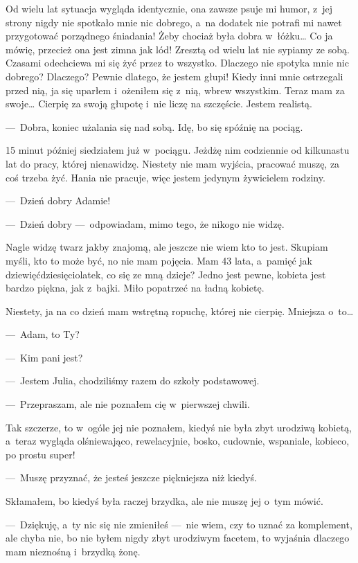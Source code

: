 Od wielu lat sytuacja wygląda identycznie, ona zawsze psuje mi humor, z~jej strony nigdy nie spotkało mnie nic dobrego, a~na dodatek nie potrafi mi nawet przygotować porządnego śniadania! Żeby chociaż była dobra w~łóżku… Co ja mówię, przecież ona jest zimna jak lód! Zresztą od wielu lat nie sypiamy ze sobą. Czasami odechciewa mi się żyć przez to wszystko. Dlaczego nie spotyka mnie nic dobrego? Dlaczego? Pewnie dlatego, że jestem głupi! Kiedy inni mnie ostrzegali przed nią, ja się uparłem i~ożeniłem się z~nią, wbrew wszystkim. Teraz mam za swoje… Cierpię za swoją głupotę i~nie liczę na szczęście. Jestem realistą.

---~Dobra, koniec użalania się nad sobą. Idę, bo się spóźnię na pociąg.
 
15 minut później siedziałem już w~pociągu. Jeżdżę nim codziennie od kilkunastu lat do pracy, której nienawidzę. Niestety nie mam wyjścia, pracować muszę, za coś trzeba żyć. Hania nie pracuje, więc jestem jedynym żywicielem rodziny.

---~Dzień dobry Adamie! 

---~Dzień dobry ---~odpowiadam, mimo tego, że nikogo nie widzę.

Nagle widzę twarz jakby znajomą, ale jeszcze nie wiem kto to jest. Skupiam myśli, kto to może być, no nie mam pojęcia. Mam 43 lata, a~pamięć jak dziewięćdziesięciolatek, co się ze mną dzieje? Jedno jest pewne, kobieta jest bardzo piękna, jak z~bajki. Miło popatrzeć na ładną kobietę.

Niestety, ja na co dzień mam wstrętną ropuchę, której nie cierpię. Mniejsza o~to…

---~Adam, to Ty?

---~Kim pani jest?

---~Jestem Julia, chodziliśmy razem do szkoły podstawowej.

---~Przepraszam, ale nie poznałem cię w~pierwszej chwili.
 
Tak szczerze, to w~ogóle jej nie poznałem, kiedyś nie była zbyt urodziwą kobietą, a~teraz wygląda olśniewająco, rewelacyjnie, bosko, cudownie, wspaniale, kobieco, po prostu super!

---~Muszę przyznać, że jesteś jeszcze piękniejsza niż kiedyś.

Skłamałem, bo kiedyś była raczej brzydka, ale nie muszę jej o~tym mówić.

---~Dziękuję, a~ty nic się nie zmieniłeś ---~nie wiem, czy to uznać za komplement, ale chyba nie, bo nie byłem nigdy zbyt urodziwym facetem, to wyjaśnia dlaczego mam nieznośną i~brzydką żonę.
 
